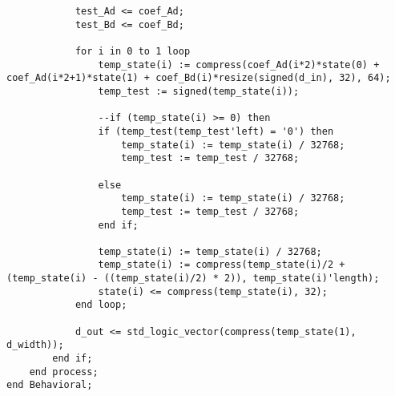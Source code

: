 \begin{lstlisting}
            test_Ad <= coef_Ad;
            test_Bd <= coef_Bd;

            for i in 0 to 1 loop
                temp_state(i) := compress(coef_Ad(i*2)*state(0) + coef_Ad(i*2+1)*state(1) + coef_Bd(i)*resize(signed(d_in), 32), 64);
                temp_test := signed(temp_state(i));

                --if (temp_state(i) >= 0) then
                if (temp_test(temp_test'left) = '0') then
                    temp_state(i) := temp_state(i) / 32768;
                    temp_test := temp_test / 32768;

                else
                    temp_state(i) := temp_state(i) / 32768;
                    temp_test := temp_test / 32768;
                end if;

                temp_state(i) := temp_state(i) / 32768;
                temp_state(i) := compress(temp_state(i)/2 + (temp_state(i) - ((temp_state(i)/2) * 2)), temp_state(i)'length);
                state(i) <= compress(temp_state(i), 32);
            end loop;

            d_out <= std_logic_vector(compress(temp_state(1), d_width));
        end if;
    end process;
end Behavioral;
\end{lstlisting}

